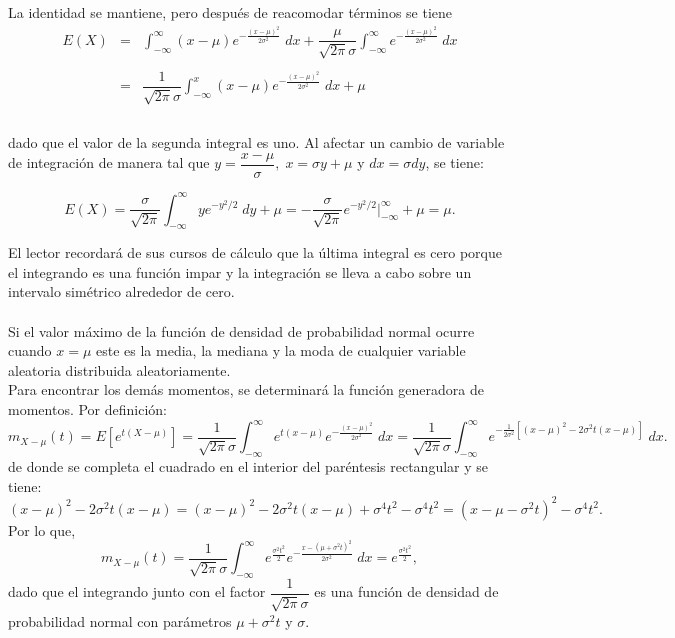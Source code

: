 La identidad se mantiene, pero después de reacomodar términos se tiene
$$\begin{array}{rcl}
    E(X)&=&\displaystyle\int_{-\infty}^\infty (x-\mu)e^{-\frac{(x-\mu)^2}{2\sigma^2}}\; dx + \dfrac{\mu}{\sqrt{2\pi}\sigma}\int_{-\infty}^\infty e^{-\frac{(x-\mu)^2}{2\sigma^2}}\; dx\\\\
	&=&\displaystyle\dfrac{1}{\sqrt{2\pi}\sigma}\int_{-\infty}^x (x-\mu)e^{-\frac{(x-\mu)^2}{2\sigma^2}}\; dx + \mu\\\\
\end{array}$$

dado que el valor de la segunda integral es uno. Al afectar un cambio de variable de integración de manera tal que $y=\dfrac{x-\mu}{\sigma},\; x=\sigma y+\mu$ y $dx=\sigma dy$, se tiene:

\begin{tcolorbox}
$$E(X)=\dfrac{\sigma}{\sqrt{2\pi}}\int_{-\infty}^\infty y e^{-y^2/2}\; dy + \mu = -\dfrac{\sigma}{\sqrt{2\pi}}e^{-y^2/2}\bigg|_{-\infty}^\infty + \mu = \mu.$$
\end{tcolorbox}

El lector recordará de sus cursos de cálculo que la última integral es cero porque el integrando es una función impar y la integración se lleva a cabo sobre un intervalo simétrico alrededor de cero.\\\\

Si el valor máximo de la función de densidad de probabilidad normal ocurre cuando $x=\mu$ este es la media, la mediana y la moda de cualquier variable aleatoria distribuida aleatoriamente.\\
Para encontrar los demás momentos, se determinará la función generadora de momentos. Por definición:
$$m_{X-\mu}(t) = E\left[e^{t(X-\mu)}\right] = \dfrac{1}{\sqrt{2\pi}\sigma} \int_{-\infty}^\infty e^{t(x-\mu)} e^{-\frac{(x-\mu)^2}{2\sigma^2}}\; dx = \dfrac{1}{\sqrt{2\pi}\sigma} \int_{-\infty}^\infty e^{-\frac{1}{2\sigma^2}\left[(x-\mu)^2-2\sigma^2 t(x-\mu)\right]}\; dx.$$
de donde se completa el cuadrado en el interior del paréntesis rectangular y se tiene:
$$(x-\mu)^2-2\sigma^2 t(x-\mu) = (x-\mu)^2-2\sigma^2 t(x-\mu)+\sigma^4 t^2 - \sigma^4 t^2 = (x-\mu-\sigma^2t)^2 - \sigma^4 t^2.$$
Por lo que,
$$m_{X-\mu}(t) = \dfrac{1}{\sqrt{2\pi}\sigma}\int_{-\infty}^\infty e^{\frac{\sigma^2 t^2}{2}}e^{-\frac{x-(\mu+\sigma^2 t)^2}{2\sigma^2}}\; dx = e^{\frac{\sigma^2t^2}{2}},$$
dado que el integrando junto con el factor $\dfrac{1}{\sqrt{2\pi}\sigma}$ es una función de densidad de probabilidad normal con parámetros $\mu+\sigma^2 t$ y $\sigma.$

